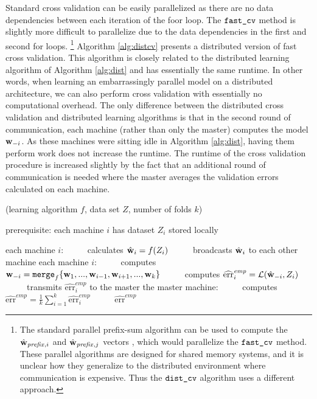 \documentclass[thesis.tex]{subfiles}
\newcommand{\riskemp}{\widehat{\textrm{err}}^\textit{emp}}
\newcommand{\fastcv}{\mkprocedure{fast\_cv}}
\newcommand{\distcv}{\mkprocedure{dist\_cv}}
\newcommand{\merge}{\mkprocedure{merge}}
\newcommand{\wprefix}{{\hat\w_\textit{prefix}}{}}
\begin{document}
Standard cross validation can be easily parallelized as there are no data dependencies between each iteration of the foor loop. 
The $\fastcv$ method is slightly more difficult to parallelize due to the data dependencies in the first and second for loops.%
\footnote{
    The standard parallel prefix-sum algorithm can be used to compute the $\wprefix_{,i}$ and $\wprefix_{,j}$ vectors \citep{ladner1980parallel,blelloch1990prefix},
    which would parallelize the $\fastcv$ method.
    These parallel algorithms are designed for shared memory systems,
    and it is unclear how they generalize to the distributed environment where communication is expensive.
    Thus the $\distcv$ algorithm uses a different approach.
}
Algorithm \ref{alg:distcv} presents a distributed version of fast cross validation.
This algorithm is closely related to the distributed learning algorithm of Algorithm \ref{alg:dist} and has essentially the same runtime.
In other words, when learning an embarrassingly parallel model on a distributed architecture,
we can also perform cross validation with essentially no computational overhead.
The only difference between the distributed cross validation and distributed learning algorithms is that in the second round of communication, 
each machine (rather than only the master) computes the model $\mathbf w_{-i}$.
As these machines were sitting idle in Algorithm \ref{alg:dist},
having them perform work does not increase the runtime.
The runtime of the cross validation procedure is increased slightly by the fact that an additional round of communication is needed where the master averages the validation errors calculated on each machine.

\begin{algorithm}[t]
    \caption{\distcv(learning algorithm $f$, data set $Z$, number of folds $k$)}
    \label{alg:distcv}
    \vspace{0.1in}
    prerequisite: each machine $i$ has dataset $Z_i$ stored locally
    \begin{algorithmic}[1]
        \State each machine $i$:
        \State ~~~~~calculates ${\hat{\mathbf w}}_i = f(Z_i)$
        \State ~~~~~broadcasts ${\hat{\mathbf w}}_i$ to each other machine
        \State each machine $i$:
        \State ~~~~~computes $\w_{-i} = \merge_f\{\w_1,...,\w_{i-1},\w_{i+1},...,\w_k\}$
        \State ~~~~~computes $\riskemp_i = \Loss(\what_{-i},Z_i)$
        \State ~~~~~transmits $\riskemp_i$ to the master
        \State the master machine:
        \State ~~~~~computes $\riskemp = \frac 1 k \sum_{i=1}^k \riskemp_i$
        \State ~~~~~\Return $\riskemp$
    \end{algorithmic}
\end{algorithm}
\end{document}
